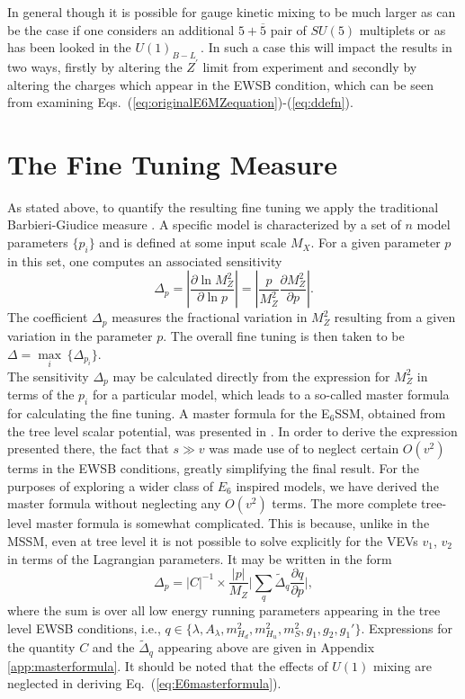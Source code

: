 \documentclass[preprint,amsmath,amssymb,aps,superscriptaddress,prd,
showpacs,floatfix,nofootinbib]{revtex4-1}
\newcommand{\be}{\begin{equation}}
\newcommand{\ee}{\end{equation}}
\begin{document}
In general though it is possible for gauge kinetic mixing to be much larger
as can be the case if one considers an additional $5 + \overline{5}$ pair of
$SU(5)$ multiplets \cite{Rizzo:1998ut} or as has been looked in the $U(1)_{B-L}$
\cite{Salvioni:2009mt,Krauss:2012ku}.  In such a case this will impact the
results in two ways, firstly by altering the $Z^\prime$ limit from experiment
and secondly by altering the charges which appear in the EWSB condition,
which can be seen from examining
Eqs.~(\ref{eq:originalE6MZequation})-(\ref{eq:ddefn}).

\section{\label{sec:tuningmeasure}The Fine Tuning
Measure}

As stated above, to quantify the resulting fine tuning we apply the
traditional Barbieri-Giudice measure \cite{Ellis:1986yg, Barbieri:1987fn}.
A specific model is characterized by a set of $n$ model parameters $\{p_i\}$
and is defined at some input scale $M_X$. For a given parameter $p$ in this
set, one computes an associated sensitivity
\begin{equation} \label{eq:bgmeasure}
\Delta_p = \left | \frac{\partial \ln M_Z^2}{\partial \ln p} \right
| = \left | \frac{p}{M_Z^2} \frac{\partial M_Z^2}{\partial p} \right | .
\end{equation}
The coefficient $\Delta_p$ measures the fractional variation in $M_Z^2$
resulting from a given variation in the parameter $p$.  The overall fine
tuning is then taken to be
$\Delta = \underset{i}{\max} \, \{ \Delta_{p_i} \}$.\\

The sensitivity $\Delta_p$ may be calculated directly from the expression
for $M_Z^2$ in terms of the $p_i$ for a particular model, which leads to a
so-called master formula for calculating the fine tuning.  A master formula
for the E$_6$SSM, obtained from the tree level scalar potential, was
presented in \cite{Athron:2013ipa}.  In order to derive the expression
presented there, the fact that $s \gg v$ was made use of to neglect certain
$O(v^2)$ terms in the EWSB conditions, greatly simplifying the final result.
For the purposes of exploring a wider class of $E_6$ inspired models, we have
derived the master formula without neglecting any $O(v^2)$ terms.  The more
complete tree-level master formula is somewhat complicated.  This is
because, unlike in the MSSM, even at tree level it is not possible to
solve explicitly for the VEVs $v_1$, $v_2$ in terms of the Lagrangian
parameters.  It may be written in the form \be \Delta_p = |C|^{-1} \times
\frac{|p|}{M_Z} \bigg | \sum_{q} \tilde{\Delta}_q \frac{\partial q}
{\partial p} \bigg | , \label{eq:E6masterformula}
\ee where the sum is over all low energy running parameters appearing
in the tree level EWSB conditions, i.e., $q \in \{\lambda , A_\lambda ,
m_{H_d}^2 , m_{H_u}^2 , m_S^2 , g_1 , g_2 , g_1'\}$.  Expressions for the
quantity $C$ and the $\tilde{\Delta}_q$ appearing above are given in
Appendix \ref{app:masterformula}.  It should be noted that the effects
of $U(1)$ mixing are neglected in deriving Eq.~(\ref{eq:E6masterformula}).
\end{document}
